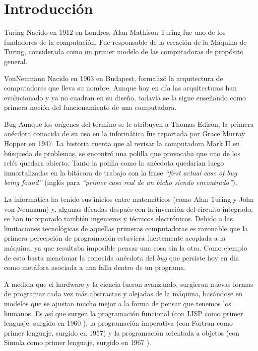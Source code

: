 
\newcommand{\caracteristica}[1]{\item \textbf{#1:}}

\section{Introducción}

\sepfootnotecontent
  {Turing}
  {Nacido en 1912 en Londres, Alan Mathison Turing fue uno de los fundadores de la computación. Fue responsable de la creación de la Máquina de Turing, considerada como un primer modelo de las computadoras de propósito general.}

\sepfootnotecontent
  {VonNeumann}
  {Nacido en 1903 en Budapest, formalizó la arquitectura de computadores que lleva su nombre. Aunque hoy en día las arquitecturas han evolucionado y ya no cuadran en su diseño, todavía se la sigue enseñando como primera noción del funcionamiento de una computadora.}

\sepfootnotecontent
  {Bug}
  {Aunque los orígenes del término se le atribuyen a Thomas Edison, la primera anécdota conocida de su uso en la informática fue reportada por Grace Murray Hopper en 1947. La historia cuenta que al revisar la computadora Mark II en búsqueda de problemas, se encontró una polilla que provocaba que uno de los relés quedara abierto. Tanto la polilla como la anécdota quedarían luego inmortalizadas en la bitácora de trabajo con la frase \textit{``first actual case of bug being found''} (inglés para \textit{``primer caso real de un bicho siendo encontrado''}).}

La informática ha tenido sus inicios entre matemáticos (como Alan Turing y John von Neumann) y, algunas décadas después con la invención del circuito integrado, se han incorporado también ingenieros y técnicos electrónicos. Debido a las limitaciones tecnológicas de aquellas primeras computadoras es razonable que la primera percepción de programación estuviera fuertemente acoplada a la máquina, ya que resultaba imposible pensar una cosa sin la otra. Como ejemplo de esto basta mencionar la conocida anécdota del \textit{bug} que persiste hoy en día como metáfora asociada a una falla dentro de un programa.

A medida que el hardware y la ciencia fueron avanzando, surgieron nuevas formas de programar cada vez más abstractas y alejadas de la máquina, basándose en modelos que se ajustan mucho mejor a la forma de pensar que tenemos los humanos. Es así que surgen la programación funcional (con LISP como primer lenguaje, surgido en 1960 \cite{Turner}), la programación imperativa (con Fortran como primer lenguaje, surgido en 1957) y la programación orientada a objetos (con Simula como primer lenguaje, surgido en 1967 \cite{wegner1990concepts}).


